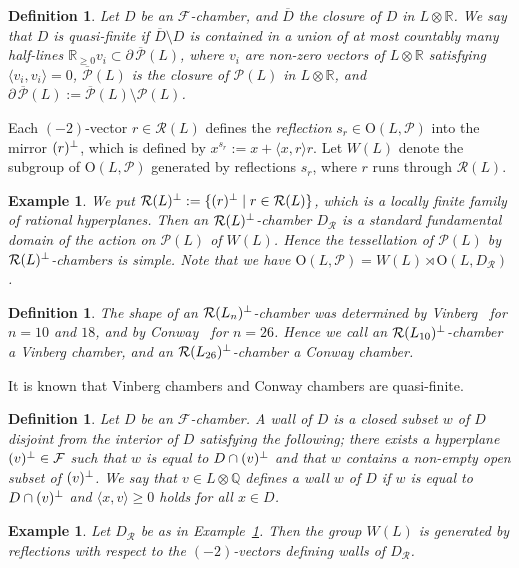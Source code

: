 \documentclass{amsart}
\newtheorem{_definition}[theorem]{Definition}
\newenvironment{definition}{\begin{_definition}\rm}{\end{_definition}}
\newtheorem{_example}[theorem]{Example}
\newenvironment{example}{\begin{_example}\rm}{\end{_example}}
\numberwithin{equation}{section}
\numberwithin{table}{section}
\numberwithin{figure}{section}
\newcommand{\Q}{\mathord{\mathbb  Q}}
\newcommand{\R}{\mathord{\mathbb R}}
\newcommand{\FFF}{\mathord{\mathcal F}}
\newcommand{\PPP}{\mathord{\mathcal P}}
\newcommand{\RRR}{\mathord{\mathcal R}}
\newcommand{\shortset}[2]{\{ {#1} \mid  {#2}   \}}
\newcommand{\tensor}{\otimes}
\newcommand{\sperp}{\sp{\perp}}
\newcommand{\semidirectproduct}{\rtimes}
\newcommand{\bdr}{\partial\,}
\newcommand{\OG}{\mathord{\mathrm{O}}}
\newcommand{\closure}[1]{\overline{#1}}
\newcommand{\intf}[1]{\langle #1 \rangle}
\newcommand{\OGP}[1]{\OG(#1, \PPP)}
\begin{document}
%
\begin{definition}
Let $D$ be an $\FFF$-chamber,
and $\closure{D}$ the closure of $D$ in $L\tensor\R$.
We say that $D$ is \emph{quasi-finite} if
$\closure{D}\setminus D$ is contained in a union of at most countably many
half-lines $\R_{\ge 0} v_i \subset \bdr\overline{\PPP}(L)$, where
$v_i$ are non-zero vectors of $L\tensor\R$ satisfying $\intf{v_i, v_i}=0$,
$\overline{\PPP}(L)$ is the closure of $\PPP(L)$ in $L\tensor\R$,
and $\bdr\overline{\PPP}(L):=\overline{\PPP}(L)\setminus \PPP(L)$.
\end{definition}
%
%
Each $(-2)$-vector  $r\in \RRR(L)$ defines the \emph{reflection}
$s_r\in \OGP{L}$ into the mirror $(r)\sperp$,
which is defined by $x^{s_r}:= x+\intf{x, r}r$.
Let $W(L)$ denote the subgroup  of $\OGP{L}$
generated by reflections $s_r$, where $r$ runs through  $\RRR(L)$.
%
\begin{example}\label{example:DRRR}
We put $\RRR(L)\sperp:=\shortset{(r)\sperp}{r\in \RRR(L)}$,
which is a locally finite family of rational hyperplanes.
Then an $\RRR(L)\sperp$-chamber $D_{\RRR}$ is a standard fundamental domain
of the action on $\PPP(L)$ of  $W(L)$.
Hence the tessellation of $\PPP(L)$ by $\RRR(L)\sperp$-chambers
is simple.
Note that we have $\OGP{L}=  W(L)\semidirectproduct \OG(L, D_{\RRR})$.
\end{example}
%
\begin{definition}
The shape of an $\RRR(L_n)\sperp$-chamber was determined by Vinberg~\cite{Vinberg1975}
for $n=10$ and  $18$, and by Conway~\cite{Conway1983} for $n=26$.
Hence we call  an $\RRR(L_{10})\sperp$-chamber a \emph{Vinberg chamber},
and an $\RRR(L_{26})\sperp$-chamber a \emph{Conway chamber}.
\end{definition}
%
It is known that Vinberg chambers and Conway chambers are quasi-finite.
%
\begin{definition}
Let $D$ be an \emph{$\FFF$-chamber}.
A \emph{wall} of $D$ is a closed subset $w$ of $D$
disjoint from the interior of $D$ satisfying the following;  there exists a hyperplane $(v)\sperp \in \FFF$
such that  $w$ is equal to $D\cap (v)\sperp$ and that $w$ contains a non-empty open subset of $(v)\sperp$.
We say that  $v\in L\tensor \Q$ \emph{defines a wall $w$} of $D$ if $w$ is equal to $D\cap (v)\sperp$
and $\intf{x, v}\ge 0$ holds for all $x\in D$.
\end{definition}
%
%
\begin{example}
Let $D_{\RRR}$ be as in Example~\ref{example:DRRR}.
Then  the group $W(L)$ is generated by reflections with respect to the $(-2)$-vectors
defining walls of $D_{\RRR}$.
\end{example}
\end{document}
